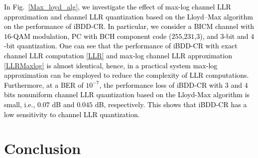\documentclass[journal]{IEEEtran}
\newtheorem{exmp}{Example}
\newcommand{\SH}{\textcolor{black}}
\newcommand{\GL}{\textcolor{black}}
\newcommand{\AG}{\textcolor{black}}
\newcommand{\GLC}[1]{\textcolor{black}{\textbf{\textit{#1}}}}
\let\originalleft\left
\let\originalright\right
\renewcommand{\left}{\mathopen{}\mathclose\bgroup\originalleft}
\renewcommand{\right}{\aftergroup\egroup\originalright}
\begin{document}
\SH{In Fig.~\ref{Max_loyd_alg}, we investigate the effect of \SH{max-log channel LLR approximation and channel LLR quantization based on the Lloyd–Max algorithm on the performance of iBDD-CR}.
In particular, we consider a BICM channel with $16$-QAM modulation, PC with BCH component code ($255$,$231$,$3$), and \AG{$3$-bit and $4$-bit quantization}. \SH{One can see that the performance of iBDD-CR with exact channel LLR computation \eqref{LLR} and max-log channel LLR approximation \eqref{LLRMaxlog} is almost identical}, hence, in a practical system max-log approximation can be employed to reduce the complexity of LLR computations. Furthermore, at a BER of $10^{-7}$, the performance loss of iBDD-CR with $3$ and $4$ bits nonuniform \SH{channel LLR} quantization based on %
the Lloyd-Max algorithm is small, i.e., $0.07$ dB and $0.045$ dB, respectively. This \AG{shows} that iBDD-CR has a low sensitivity to channel LLR quantization.} 

   

\section{Conclusion}
\end{document}
